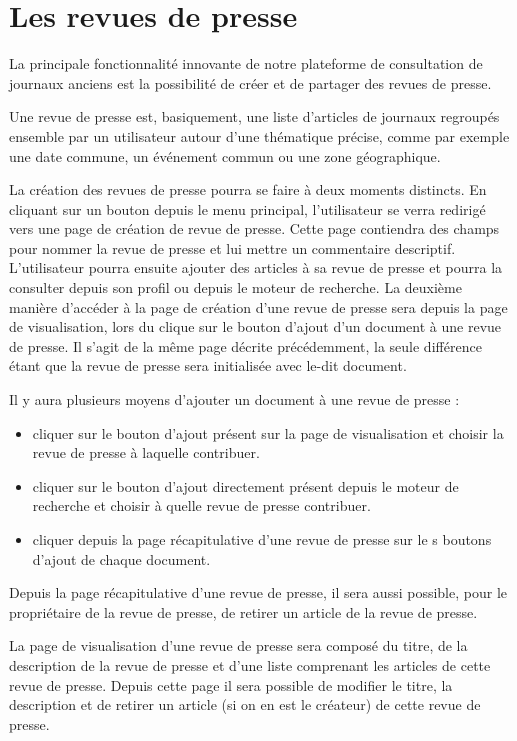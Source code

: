 \section{Les revues de presse}
\label{sec:revue}

La principale fonctionnalité innovante de notre plateforme de consultation de journaux anciens est la possibilité de
créer et de partager des revues de presse.

Une revue de presse est, basiquement, une liste d'articles de journaux regroupés ensemble par un utilisateur autour d'une thématique précise,
comme par exemple une date commune, un événement commun ou une zone géographique.

La création des revues de presse pourra se faire à deux moments distincts. En cliquant sur un bouton depuis le menu principal, l'utilisateur se verra redirigé vers une page de création de revue de presse. Cette page contiendra des champs pour nommer la revue de presse et lui mettre un commentaire descriptif. L'utilisateur pourra ensuite ajouter des articles à sa revue de presse et pourra la consulter depuis son profil ou depuis le moteur de recherche. La deuxième manière d'accéder à la page de création d'une revue de presse sera depuis la page de visualisation, lors du clique sur le bouton d'ajout d'un document à une revue de presse. Il s'agit de la même page décrite précédemment,
la seule différence étant que la revue de presse sera initialisée avec le-dit document.

Il y aura plusieurs moyens d'ajouter un document à une revue de presse :  

\begin{itemize}
  \item cliquer sur le bouton d'ajout présent sur la page de visualisation et choisir la
revue de presse à laquelle contribuer.
  \item cliquer sur le bouton d'ajout directement présent depuis le moteur de recherche et choisir
à quelle revue de presse contribuer.
  \item cliquer depuis la page récapitulative d'une revue de presse sur le s boutons d'ajout de chaque document.
\end{itemize}
Depuis la page récapitulative d'une revue de presse, il sera aussi possible, pour le propriétaire de la revue de presse, de retirer un article de
la revue de presse.

La page de visualisation d'une revue de presse sera composé du titre, de la description de la revue de presse et d'une liste comprenant les articles
de cette revue de presse. Depuis cette page il sera possible de modifier le titre, la description et de retirer un article (si on en est le créateur) de cette revue de presse.